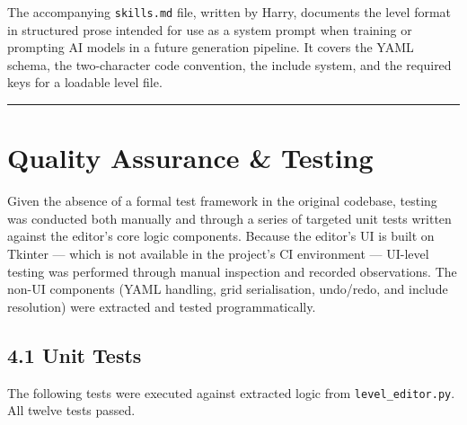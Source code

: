 The accompanying \texttt{skills.md} file, written by Harry, documents
the level format in structured prose intended for use as a system prompt
when training or prompting AI models in a future generation pipeline. It
covers the YAML schema, the two-character code convention, the include
system, and the required keys for a loadable level file.

\begin{center}\rule{0.5\linewidth}{0.5pt}\end{center}

\section{Quality Assurance \& Testing}\label{quality-assurance-testing}

Given the absence of a formal test framework in the original codebase,
testing was conducted both manually and through a series of targeted
unit tests written against the editor's core logic components. Because
the editor's UI is built on Tkinter --- which is not available in the
project's CI environment --- UI-level testing was performed through
manual inspection and recorded observations. The non-UI components (YAML
handling, grid serialisation, undo/redo, and include resolution) were
extracted and tested programmatically.

\subsection{4.1 Unit Tests}\label{unit-tests}

The following tests were executed against extracted logic from
\texttt{level\_editor.py}. All twelve tests passed.


